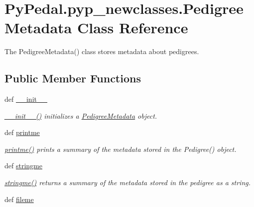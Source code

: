\hypertarget{classPyPedal_1_1pyp__newclasses_1_1PedigreeMetadata}{
\section{PyPedal.pyp\_\-newclasses.PedigreeMetadata Class Reference}
\label{classPyPedal_1_1pyp__newclasses_1_1PedigreeMetadata}
}


The PedigreeMetadata() class stores metadata about pedigrees.  


\subsection*{Public Member Functions}
\begin{DoxyCompactItemize}
\item 
def \hyperlink{classPyPedal_1_1pyp__newclasses_1_1PedigreeMetadata_a105725f2e02e846685c702105d9c75a4}{\_\-\_\-init\_\-\_\-}
\begin{DoxyCompactList}\small\item\em \hyperlink{classPyPedal_1_1pyp__newclasses_1_1PedigreeMetadata_a105725f2e02e846685c702105d9c75a4}{\_\-\_\-init\_\-\_\-()} initializes a \hyperlink{classPyPedal_1_1pyp__newclasses_1_1PedigreeMetadata}{PedigreeMetadata} object. \end{DoxyCompactList}\item 
def \hyperlink{classPyPedal_1_1pyp__newclasses_1_1PedigreeMetadata_a7f23e64e27bd497a11e64aee955654d9}{printme}
\begin{DoxyCompactList}\small\item\em \hyperlink{classPyPedal_1_1pyp__newclasses_1_1PedigreeMetadata_a7f23e64e27bd497a11e64aee955654d9}{printme()} prints a summary of the metadata stored in the Pedigree() object. \end{DoxyCompactList}\item 
def \hyperlink{classPyPedal_1_1pyp__newclasses_1_1PedigreeMetadata_a4f6249ec84966de2733ec856b4763e2a}{stringme}
\begin{DoxyCompactList}\small\item\em \hyperlink{classPyPedal_1_1pyp__newclasses_1_1PedigreeMetadata_a4f6249ec84966de2733ec856b4763e2a}{stringme()} returns a summary of the metadata stored in the pedigree as a string. \end{DoxyCompactList}\item 
def \hyperlink{classPyPedal_1_1pyp__newclasses_1_1PedigreeMetadata_a8af37f0f55bc77dca77228986185fbe7}{fileme}

\end{DoxyCompactItemize}

